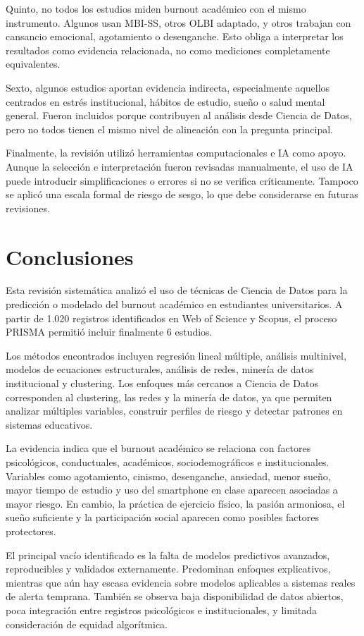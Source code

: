 \documentclass[12pt,a4paper]{article}
\begin{document}
Quinto, no todos los estudios miden burnout académico con el mismo instrumento. Algunos usan MBI-SS, otros OLBI adaptado, y otros trabajan con cansancio emocional, agotamiento o desenganche. Esto obliga a interpretar los resultados como evidencia relacionada, no como mediciones completamente equivalentes.

Sexto, algunos estudios aportan evidencia indirecta, especialmente aquellos centrados en estrés institucional, hábitos de estudio, sueño o salud mental general. Fueron incluidos porque contribuyen al análisis desde Ciencia de Datos, pero no todos tienen el mismo nivel de alineación con la pregunta principal.

Finalmente, la revisión utilizó herramientas computacionales e IA como apoyo. Aunque la selección e interpretación fueron revisadas manualmente, el uso de IA puede introducir simplificaciones o errores si no se verifica críticamente. Tampoco se aplicó una escala formal de riesgo de sesgo, lo que debe considerarse en futuras revisiones.

\section{Conclusiones}

Esta revisión sistemática analizó el uso de técnicas de Ciencia de Datos para la predicción o modelado del burnout académico en estudiantes universitarios. A partir de 1.020 registros identificados en Web of Science y Scopus, el proceso PRISMA permitió incluir finalmente 6 estudios.

Los métodos encontrados incluyen regresión lineal múltiple, análisis multinivel, modelos de ecuaciones estructurales, análisis de redes, minería de datos institucional y clustering. Los enfoques más cercanos a Ciencia de Datos corresponden al clustering, las redes y la minería de datos, ya que permiten analizar múltiples variables, construir perfiles de riesgo y detectar patrones en sistemas educativos.

La evidencia indica que el burnout académico se relaciona con factores psicológicos, conductuales, académicos, sociodemográficos e institucionales. Variables como agotamiento, cinismo, desenganche, ansiedad, menor sueño, mayor tiempo de estudio y uso del smartphone en clase aparecen asociadas a mayor riesgo. En cambio, la práctica de ejercicio físico, la pasión armoniosa, el sueño suficiente y la participación social aparecen como posibles factores protectores.

El principal vacío identificado es la falta de modelos predictivos avanzados, reproducibles y validados externamente. Predominan enfoques explicativos, mientras que aún hay escasa evidencia sobre modelos aplicables a sistemas reales de alerta temprana. También se observa baja disponibilidad de datos abiertos, poca integración entre registros psicológicos e institucionales, y limitada consideración de equidad algorítmica.
\end{document}

